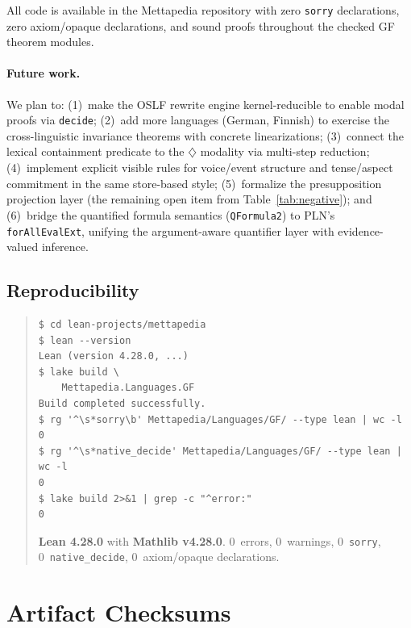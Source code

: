 \documentclass[11pt]{article}
\newcommand{\code}[1]{\texttt{#1}}
\newcommand{\Dia}{\ensuremath{\diamondsuit}}
\newcommand{\OSLF}{\textup{OSLF}}
\newcommand{\GF}{\textup{GF}}
\begin{document}
All code is available in the Mettapedia repository with zero
\code{sorry} declarations, zero axiom/opaque declarations, and sound proofs
throughout the checked \GF{} theorem modules.

\paragraph{Future work.}  We plan to: (1)~make the \OSLF{} rewrite engine
kernel-reducible to enable modal proofs via \code{decide}; (2)~add more
languages (German, Finnish) to exercise the cross-linguistic invariance
theorems with concrete linearizations; (3)~connect the lexical containment
predicate to the $\Dia$ modality via multi-step reduction;
(4)~implement explicit visible rules for voice/event structure and
tense/aspect commitment in the same store-based style;
(5)~formalize the presupposition projection layer (the remaining
open item from Table~\ref{tab:negative}); and
(6)~bridge the quantified formula semantics (\code{QFormula2}) to
PLN's \code{forAllEvalExt}, unifying the argument-aware quantifier
layer with evidence-valued inference.

\subsection*{Reproducibility}

\begin{quote}
\small
\begin{verbatim}
$ cd lean-projects/mettapedia
$ lean --version
Lean (version 4.28.0, ...)
$ lake build \
    Mettapedia.Languages.GF
Build completed successfully.
$ rg '^\s*sorry\b' Mettapedia/Languages/GF/ --type lean | wc -l
0
$ rg '^\s*native_decide' Mettapedia/Languages/GF/ --type lean | wc -l
0
$ lake build 2>&1 | grep -c "^error:"
0
\end{verbatim}

\textbf{Lean 4.28.0} with \textbf{Mathlib v4.28.0}.
0~errors, 0~warnings, 0~\code{sorry},
0~\code{native\_decide}, 0~axiom/opaque declarations.
\end{quote}




\appendix
\section{Artifact Checksums}
\label{app:artifact}
\end{document}
